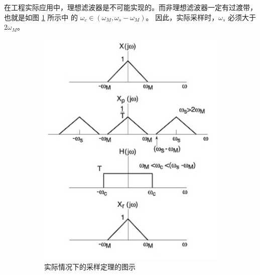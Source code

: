 \begin{example}
    在工程实际应用中，理想滤波器是不可能实现的。而非理想滤波器一定有过渡带，
    也就是如图 \ref{fig:real-sampling-theorem} 所示中
    的 $\omega_c \in (\omega_M, \omega_s - \omega_M)$。
    因此，实际采样时，$\omega_s$ 必须大于 $2\omega_M$。
    \begin{figure}[H]
        \centering
        \begin{subfigure}{0.45\textwidth}
            \centering
            \includegraphics[width=\textwidth]{chap2/img/real-sampling-theorem.png}
            \caption{实际情况下的采样定理的图示}
            \label{fig:real-sampling-theorem}
        \end{subfigure}
        \hfill
        \begin{subfigure}{0.45\textwidth}
            \centering
\end{subfigure}
\end{figure}
\end{example}
